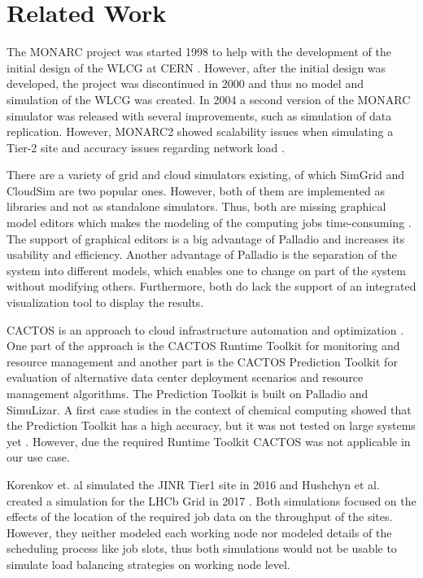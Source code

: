 \documentclass[a4paper]{jpconf}
\begin{document}
\section{Related Work}
\label{related}
The MONARC project was started 1998 to help with the development of the initial design of the WLCG at CERN \cite{monarc2000models}.
However, after the initial design was developed, the project was discontinued in 2000 and thus no model and simulation of the WLCG was created. 
In 2004 a second version of the MONARC simulator was released with several improvements, such as simulation of data replication. However, MONARC2 showed scalability issues when simulating a Tier-2 site and accuracy issues regarding network load \cite{1742-6596-331-7-072038}.

There are a variety of grid and cloud simulators existing, of which SimGrid and CloudSim are two popular ones. 
However, both of them are implemented as libraries and not as standalone simulators. Thus, both are missing graphical model editors which makes the modeling of the computing jobs time-consuming \cite{simgrid}\cite{cloudsim}. The support of graphical editors is a big advantage of Palladio and increases its usability and efficiency. Another advantage of Palladio is the separation of the system into different models, which enables one to change on part of the system without modifying others. Furthermore, both do lack the support of an integrated visualization tool to display the results.  


CACTOS is an approach to cloud infrastructure automation and optimization \cite{cactos}.
One part of the approach is the CACTOS Runtime Toolkit for monitoring and resource management and another part is the CACTOS Prediction Toolkit for evaluation of alternative data center deployment scenarios and resource management algorithms. The Prediction Toolkit is built on Palladio and SimuLizar.
A first case studies in the context of chemical computing showed that the Prediction Toolkit has a high accuracy, but it was not tested on large systems yet \cite{rapidtesting}. However, due the required Runtime Toolkit CACTOS was not applicable in our use case.

Korenkov et. al simulated the JINR Tier1 site in 2016 \cite{jinr} and Hushchyn et al. created a simulation for the LHCb Grid in 2017 \cite{lhcb}. Both simulations focused on the effects of the location of the required job data on the throughput of the sites.
However, they neither modeled each working node nor modeled details of the scheduling process like job slots, thus both simulations would not be usable to simulate load balancing strategies on working node level.
\end{document}
